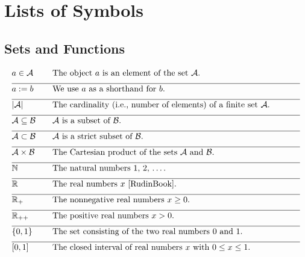 
\section*{Lists of Symbols}

\vspace*{-2mm}
\subsection*{Sets and Functions} 

\begin{align} 
	&a \in \mathcal{A} & \quad & \parbox{.85\textwidth}{The object $a$ is an element of the set $\mathcal{A}$.} \nonumber \\[2mm] \hline \nonumber\\[-5mm]
	&a \defeq b & \quad & \mbox{We use $a$ as a shorthand for $b$. }\nonumber \\[2mm] \hline \nonumber\\[-5mm]
	&|\mathcal{A}| & \quad & \mbox{The cardinality (i.e., number of elements) of a finite set $\mathcal{A}$.}\nonumber \\[2mm] \hline \nonumber\\[-5mm]
	&\mathcal{A} \subseteq \mathcal{B}& \quad & \mbox{$\mathcal{A}$ is a subset of $\mathcal{B}$.}\nonumber \\[2mm] \hline \nonumber\\[-5mm]
	&\mathcal{A} \subset \mathcal{B}& \quad & \mbox{$\mathcal{A}$ is a strict subset of $\mathcal{B}$.} \nonumber \\[2mm] \hline \nonumber\\[-5mm]
	&\mathcal{A} \times \mathcal{B} & \quad & \mbox{The Cartesian product of the sets $\mathcal{A}$ and $\mathcal{B}$.} \nonumber \\[2mm] \hline \nonumber\\[-5mm]
	&\mathbb{N} & \quad & \mbox{The natural numbers $1, \,2, \,\dots$.}\nonumber \\[2mm] \hline \nonumber\\[-5mm]
	&\mathbb{R}  &\quad &\mbox{The real numbers $x$ \cite{RudinBook}.} \nonumber \\[2mm] \hline \nonumber\\[-5mm]
	&\mathbb{R}_{+}  &\quad &\mbox{The nonnegative real numbers $x\geq0$.}\nonumber \\[2mm] \hline \nonumber\\[-5mm]
	&\mathbb{R}_{++}  &\quad &\mbox{The positive real numbers $x> 0$.} \nonumber \\[2mm] \hline \nonumber\\[-5mm]
	&\{0,1\}& \quad & \mbox{The set consisting of the two real numbers $0$ and $1$.} \nonumber \\[2mm] \hline \nonumber\\[-5mm]
	&[0,1] &\quad &\mbox{The closed interval of real numbers $x$ with $0 \leq x \leq 1$. }\nonumber 
\end{align} 

